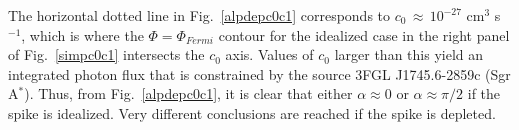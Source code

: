 \documentclass[11pt]{article}
\newcommand{\be}{\begin{equation}}
\newcommand{\ee}{\end{equation}}
\begin{document}
The horizontal dotted line in Fig.~\ref{alpdepc0c1} corresponds to $c_0 \, \approx \,  10^{-27}$ cm$^3$ s$^{-1}$, which is where the $\Phi = \Phi_{Fermi}$ contour for the idealized case in the right panel of Fig.~\ref{simpc0c1} intersects the $c_0$ axis. Values of $c_0$ larger than this yield an integrated photon flux that is constrained by the source 3FGL J1745.6-2859c (Sgr A$^*$). Thus, from Fig.~\ref{alpdepc0c1}, it is clear that either $\alpha \approx 0$ or $\alpha \approx \pi/2$ if the spike is idealized. Very different conclusions are reached if the spike is depleted.

%
%




\end{document}
